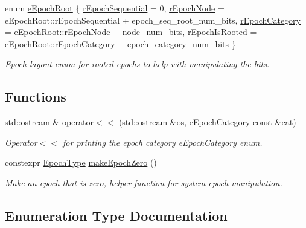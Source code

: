 \begin{DoxyCompactItemize}
\item 
enum \hyperlink{namespacevt_1_1epoch_a03454759f2f9572f84e51fdb7d76007d}{e\+Epoch\+Root} \{ \hyperlink{namespacevt_1_1epoch_a03454759f2f9572f84e51fdb7d76007dabcd342843facde01d354a2456ae5ed1f}{r\+Epoch\+Sequential} = 0, 
\hyperlink{namespacevt_1_1epoch_a03454759f2f9572f84e51fdb7d76007da19f3b4d1d3a2178e5e4a66f0a260520b}{r\+Epoch\+Node} = e\+Epoch\+Root\+:\+:r\+Epoch\+Sequential + epoch\+\_\+seq\+\_\+root\+\_\+num\+\_\+bits, 
\hyperlink{namespacevt_1_1epoch_a03454759f2f9572f84e51fdb7d76007da39238912b8dfc520dab52217f960c860}{r\+Epoch\+Category} = e\+Epoch\+Root\+:\+:r\+Epoch\+Node + node\+\_\+num\+\_\+bits, 
\hyperlink{namespacevt_1_1epoch_a03454759f2f9572f84e51fdb7d76007daac0bb1e87c328e3165a0114430693cb8}{r\+Epoch\+Is\+Rooted} = e\+Epoch\+Root\+:\+:r\+Epoch\+Category + epoch\+\_\+category\+\_\+num\+\_\+bits
 \}\begin{DoxyCompactList}\small\item\em Epoch layout enum for rooted epochs to help with manipulating the bits. \end{DoxyCompactList}
\end{DoxyCompactItemize}
\subsection*{Functions}
\begin{DoxyCompactItemize}
\item 
std\+::ostream \& \hyperlink{namespacevt_1_1epoch_ac6e7a477d5b11270b5b1e6f7a70e3bd5}{operator$<$$<$} (std\+::ostream \&os, \hyperlink{namespacevt_1_1epoch_a956abe0aceef0d10a988de8acb002c7c}{e\+Epoch\+Category} const \&cat)
\begin{DoxyCompactList}\small\item\em Operator$<$$<$ for printing the epoch category {\ttfamily e\+Epoch\+Category} enum. \end{DoxyCompactList}\item 
constexpr \hyperlink{structvt_1_1epoch_1_1_epoch_type}{Epoch\+Type} \hyperlink{namespacevt_1_1epoch_a8fb587afa4725bab7d0d4d593331f5c3}{make\+Epoch\+Zero} ()
\begin{DoxyCompactList}\small\item\em Make an epoch that is zero, helper function for system epoch manipulation. \end{DoxyCompactList}\end{DoxyCompactItemize}


\subsection{Enumeration Type Documentation}
\mbox{\label{namespacevt_1_1epoch_a956abe0aceef0d10a988de8acb002c7c}} 
